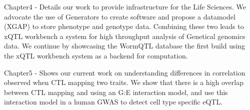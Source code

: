 Chapter4 - Details our work to provide infrastructure for the Life Sciences. We advocate the 
use of Generators to create software and propose a datamodel (XGAP) to store phenotype and 
genotype data. Combining these two leads to xQTL workbench a system for high throughput 
analysis of Genetical genomics data. We continue by showcasing the WormQTL database the first 
build using the xQTL workbench system as a backend for computation.

Chapter5 -  Shows our current work on understanding differences in correlation observed when 
CTL mapping two traits. We show that there is a high overlap between CTL mapping and using an 
G:E interaction model, and use this interaction model in a human GWAS to detect cell type 
specific eQTL.

